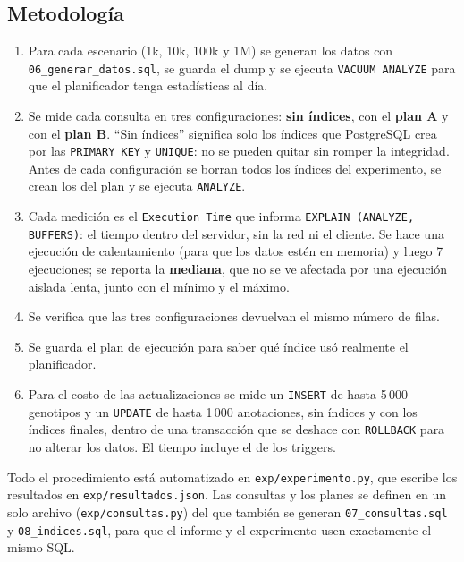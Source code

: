 \subsection{Metodología}

\begin{enumerate}
  \item Para cada escenario (1k, 10k, 100k y 1M) se generan los datos con \texttt{06\_\allowbreak{}generar\_\allowbreak{}datos.sql}, se guarda el
        dump y se ejecuta \texttt{VACUUM ANALYZE} para que el planificador tenga estadísticas al día.
  \item Se mide cada consulta en tres configuraciones: \textbf{sin índices}, con el \textbf{plan A} y con el
        \textbf{plan B}. ``Sin índices'' significa solo los índices que PostgreSQL crea por las \texttt{PRIMARY KEY}
        y \texttt{UNIQUE}: no se pueden quitar sin romper la integridad. Antes de cada configuración se borran
        todos los índices del experimento, se crean los del plan y se ejecuta \texttt{ANALYZE}.
  \item Cada medición es el \texttt{Execution Time} que informa \texttt{EXPLAIN (ANALYZE, BUFFERS)}: el tiempo
        dentro del servidor, sin la red ni el cliente. Se hace una ejecución de calentamiento (para que los datos
        estén en memoria) y luego 7 ejecuciones; se reporta la \textbf{mediana}, que no se ve afectada por una
        ejecución aislada lenta, junto con el mínimo y el máximo.
  \item Se verifica que las tres configuraciones devuelvan el mismo número de filas.
  \item Se guarda el plan de ejecución para saber qué índice usó realmente el planificador.
  \item Para el costo de las actualizaciones se mide un \texttt{INSERT} de hasta 5\,000 genotipos y un \texttt{UPDATE}
        de hasta 1\,000 anotaciones, sin índices y con los índices finales, dentro de una transacción que se
        deshace con \texttt{ROLLBACK} para no alterar los datos. El tiempo incluye el de los triggers.
\end{enumerate}

Todo el procedimiento está automatizado en \texttt{exp/experimento.py}, que escribe los resultados en
\texttt{exp/resultados.json}. Las consultas y los planes se definen en un solo archivo (\texttt{exp/consultas.py})
del que también se generan \texttt{07\_\allowbreak{}consultas.sql} y \texttt{08\_\allowbreak{}indices.sql}, para que el informe y el
experimento usen exactamente el mismo SQL.

